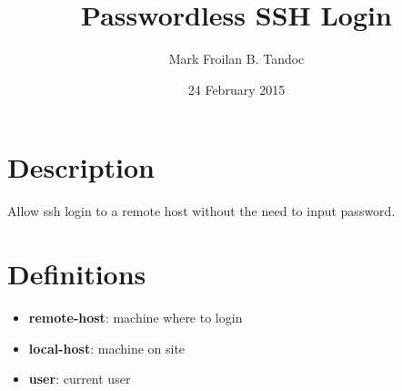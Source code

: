 \documentclass[12pt]{article}
\title{Passwordless SSH Login}
\author{Mark Froilan B. Tandoc}
\date{24 February 2015}
\begin{document}
\maketitle

\section*{Description}
Allow ssh login to a remote host without the need to input password.

\section*{Definitions}
\begin{itemize}
\item \textbf{remote-host}: machine where to login
\item \textbf{local-host}: machine on site
\item \textbf{user}: current user
\end{itemize}
\end{document}
